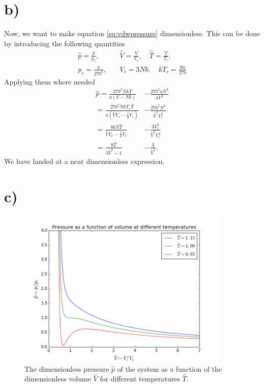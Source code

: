\documentclass{article}
\begin{document}
\section*{b)}
Now, we want to make equation \ref{eq:vdwpressure} dimensionless. This can be done by introducing the following quantities
\begin{align*}
\hat{p} = \frac{p}{p_c}, \quad &\hat{V} = \frac{V}{V_c}, \quad \hat{T} = \frac{T}{T_c}, \\
p_c = \frac{a}{27b^2}, \quad &V_c = 3Nb, \quad kT_c = \frac{8a}{27b}
\end{align*}
Applying them where needed
\begin{align*}
\hat{p} = \frac{27b^2NkT}{a(V-Nb)} &- \frac{27b^2aN^2}{aV^2} \\
		= \frac{27b^2NkT_c\hat{T}}{a(\hat{V}V_c-\frac{1}{3}V_c)} &- \frac{27b^2N^2}{\hat{V}^2V_c^2} \\
		= \frac{8bN\hat{T}}{\hat{V}V_c-\frac{1}{3}V_c} &- \frac{3V_c^2}{\hat{V}^2V_c^2} \\
		= \frac{8\hat{T}}{3\hat{V}^2-1} &- \frac{3}{\hat{V}^2}.
\end{align*}
We have landed at a neat dimensionless expression.

\section*{c)}
\begin{figure}
	\centering
	\includegraphics[width=0.9\textwidth]{figures/pressureVsVolume.png}
	\caption{The dimensionless pressure $\hat{p}$ of the system as a function of the dimensionless volume $\hat{V}$ for different temperatures $\hat{T}$.}
	\label{fig:pressureVsVolume}
\end{figure}
\end{document}

